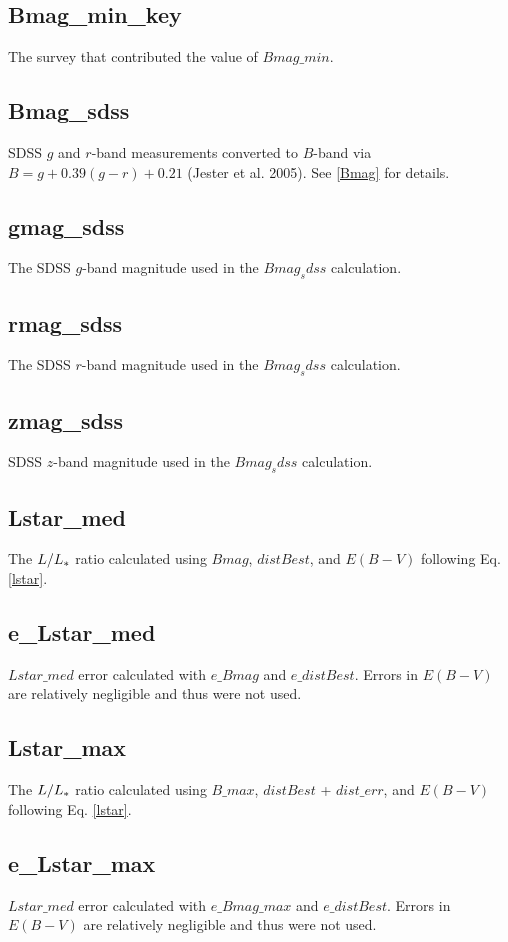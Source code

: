\documentclass[iop]{emulateapj-rtx4}
\begin{document}
\subsection{Bmag\_min\_key}
The survey that contributed the value of $Bmag\_min$.

\subsection{Bmag\_sdss}
SDSS $g$ and $r$-band measurements converted to $B$-band via $B = g + 0.39 (g-r) + 0.21$ (Jester et al. 2005). See \ref{Bmag} for details.

\subsection{gmag\_sdss}
The SDSS $g$-band magnitude used in the $Bmag_sdss$ calculation.

\subsection{rmag\_sdss}
The SDSS $r$-band magnitude used in the $Bmag_sdss$ calculation. 

\subsection{zmag\_sdss}
SDSS $z$-band magnitude used in the $Bmag_sdss$ calculation.

\subsection{Lstar\_med}
The $L / L_{\**}$ ratio calculated using $Bmag$, $distBest$, and $E(B-V)$ following Eq. \ref{lstar}.

\subsection{e\_Lstar\_med}
$Lstar\_med$ error calculated with $e\_Bmag$ and $e\_distBest$. Errors in $E(B-V)$ are relatively negligible and thus were not used.

\subsection{Lstar\_max}
The $L / L_{\**}$ ratio calculated using $B\_max$, $distBest$ + $dist\_err$, and $E(B-V)$ following Eq. \ref{lstar}.

\subsection{e\_Lstar\_max}
$Lstar\_med$ error calculated with $e\_Bmag\_max$ and $e\_distBest$. Errors in $E(B-V)$ are relatively negligible and thus were not used.
\end{document}
